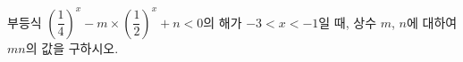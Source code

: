 부등식 $\left(\dfrac{1}{4}\right)^{x}-m\times\left(\dfrac{1}{2}\right)^{x}+n<0$의 해가 $-3<x<-1$일 때, 상수 $m$, $n$에 대하여 $mn$의 값을 구하시오.
